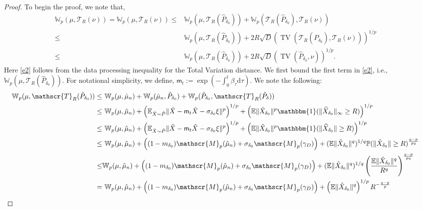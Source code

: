 \documentclass[12pts]{article}
\newcommand{\diff}{\mathrm{d}}
\newcommand{\prob}{\mathbb{P}}
\newcommand{\one}{\mathbbm{1}}
\newcommand{\sM}{ \mathscr{M}}
\newcommand{\sT}{ \mathscr{T}}
\newcommand{\hP}{ \hat{P}}
\newcommand{\hX}{ \widehat{X}}
\newcommand{\hmu}{\hat{\mu}}
\newcommand{\E}{\mathbb{E}}
\newcommand{\fW}{\mathbb{W}}
\newcommand{\tv}{\operatorname{TV}}
\begin{document}
\begin{proof}
To begin the proof, we note that,
\begingroup
\allowdisplaybreaks
\begin{align}
    \fW_p(\mu, \sT_R(\nu)) = \fW_p(\mu, \sT_R(\nu)) 
    \le & \fW_p(\mu, \sT_R(\hP_{\delta_0})) + \fW_p(\sT_R(\hP_{\delta_0}), \sT_R(\nu)) \nonumber\\
    \le & \fW_p(\mu, \sT_R(\hP_{\delta_0})) + 2R \sqrt{D} \left(\tv(\sT_R(\hP_{\delta_0}), \sT_R(\nu))\right)^{1/p} \label{e1}\\
    \le & \fW_p(\mu, \sT_R(\hP_{\delta_0})) + 2R \sqrt{D} \left(\tv(\hP_{\delta_0}, \nu)\right)^{1/p}. \label{e2}
\end{align}
\endgroup
Here \eqref{e2} follows from the data processing inequality for the Total Variation distance. We first bound the first term in \eqref{e2}, i.e., $\fW_p(\mu, \sT_R(\hP_{\delta_0}))$. For notational simplicity, we define, \(\mathsf{m}_t := \exp\left(-\int_0^t \beta_\tau \diff  \tau\right).\) We note the following: 
\begingroup
\allowdisplaybreaks
\begin{align}
       \fW_p(\mu, \sT_R(\hP_{\delta_0})) 
    \le & \ \fW_p(\mu, \hmu_n) +  \fW_p(\hmu_n, \hP_{\delta_0}) + \fW_p(\hP_{\delta_0}, \sT_R(\hP_{\delta}) ) \nonumber\\
    \le & \ \fW_p(\mu, \hmu_n) + \left(\E_{\hat{X} \sim \hP} \|\hat{X} - \mathsf{m}_t \hat{X} - \sigma_{\delta_0} \xi\|^p \right)^{1/p}+ \left(\E \|\hat{X}_{\delta_0}\|^p \one(\|\hX_{\delta_0}\|_\infty \ge R) \right)^{1/p}\nonumber\\
    \le & \ \fW_p(\mu, \hmu_n) + \left(\E_{\hat{X} \sim \hP} \|\hat{X} - \mathsf{m}_t \hat{X} - \sigma_{\delta_0} \xi\|^p\right)^{1/p} + \left(\E \|\hat{X}_{\delta_0}\|^p \one(\|\hX_{\delta_0}\| \ge R)\right)^{1/p} \nonumber\\
    \le & \ \fW_p(\mu, \hmu_n) +  \left( (1-m_{\delta_0}) \sM_p(\hmu_n) + \sigma_{\delta_0} \sM_p(\gamma_D) \right)  + (\E \|\hat{X}_{\delta_0}\|^q)^{1/q} \prob(\|\hat{X}_{\delta_0}\|\ge R)^{\frac{q-p}{pq}} \label{e3} \\
    \le & \fW_p(\mu, \hmu_n) +  \left( (1-m_{\delta_0}) \sM_p(\hmu_n) + \sigma_{\delta_0} \sM_p(\gamma_D) \right) 
    + (\E \|\hat{X}_{\delta_0}\|^q)^{1/q} \left(\frac{\E \|\hat{X}_{\delta_0}\|^q}{R^q}\right)^{\frac{q-p}{pq}} \label{e4}\\
    = & \ \fW_p(\mu, \hmu_n) +  \left( (1-m_{\delta_0}) \sM_p(\hmu_n) + \sigma_{\delta_0} \sM_p(\gamma_D) \right) + \left(\E \|\hat{X}_{\delta_0}\|^q\right)^{1/p} R^{-\frac{q-p}{p}} \nonumber\\

\end{align}
\end{proof}
\end{document}
